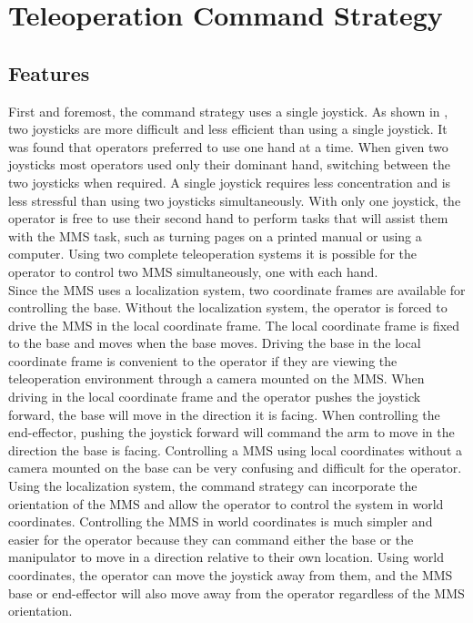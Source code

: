 \documentclass[onecolumn,10pt,final]{asme2ej}
\begin{document}
\section{Teleoperation Command Strategy}
\label{sec:three}
\subsection{Features}
\label{sec:feats}
First and foremost, the command strategy uses a single joystick. As shown in \cite{w2}, two joysticks are more difficult and less efficient than using a single joystick. It was found that operators preferred to use one hand at a time. When given two joysticks most operators used only their dominant hand, switching between the two joysticks when required. A single joystick requires less concentration and is less stressful than using two joysticks simultaneously. With only one joystick, the operator is free to use their second hand to perform tasks that will assist them with the MMS task, such as turning pages on a printed manual or using a computer. Using two complete teleoperation systems it is possible for the operator to control two MMS simultaneously, one with each hand.\\

Since the MMS uses a localization system, two coordinate frames are available for controlling the base. Without the localization system, the operator is forced to drive the MMS in the local coordinate frame. The local coordinate frame is fixed to the base and moves when the base moves. Driving the base in the local coordinate frame is convenient to the operator if they are viewing the teleoperation environment through a camera mounted on the MMS. When driving in the local coordinate frame and the operator pushes the joystick forward, the base will move in the direction it is facing. When controlling the end-effector, pushing the joystick forward will command the arm to move in the direction the base is facing. Controlling a MMS using local coordinates without a camera mounted on the base can be very confusing and difficult for the operator. Using the localization system, the command strategy can incorporate the orientation of the MMS and allow the operator to control the system in world coordinates. Controlling the MMS in world coordinates is much simpler and easier for the operator because they can command either the base or the manipulator to move in a direction relative to their own location. Using world coordinates, the operator can move the joystick away from them, and the MMS base or end-effector will also move away from the operator regardless of the MMS orientation.\\
\end{document}
